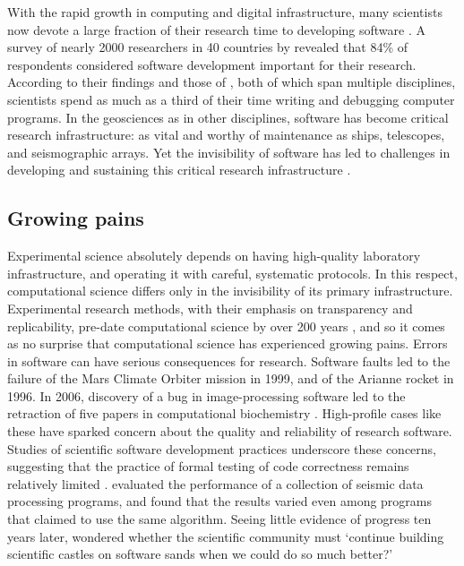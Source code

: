 \documentclass[12pt]{amsart}
\begin{document}
With the rapid growth in computing and digital infrastructure, many scientists now devote a large fraction of their research time to developing software \citep{hannay2009scientists,prabhu2011survey,wilson2014best,singh2016unsung,pinto2018scientists}. A survey of nearly 2000 researchers in 40 countries by \citet{hannay2009scientists} revealed that 84\% of respondents considered software development important for their research. According to their findings and those of \citet{prabhu2011survey}, both of which span multiple disciplines, scientists spend as much as a third of their time writing and debugging computer programs. In the geosciences as in other disciplines, software has become critical research infrastructure: as vital and worthy of maintenance as ships, telescopes, and seismographic arrays. Yet the invisibility of software  has led to challenges in developing and sustaining this critical research infrastructure \citep{eghbal2016roads}.


\subsection{Growing pains}

Experimental science absolutely depends on having high-quality laboratory infrastructure, and operating it with careful, systematic protocols. In this respect, computational science differs only in the invisibility of its primary infrastructure. Experimental research methods, with their emphasis on transparency and replicability, pre-date computational science by over 200 years \citep{wilson2006s,fomel2009reproducible}, and so it comes as no surprise that computational science has experienced growing pains. Errors in software can have serious consequences for research. Software faults led to the failure of the Mars Climate Orbiter mission in 1999, and of the Arianne rocket in 1996. In 2006, discovery of a bug in image-processing software led to the retraction of five papers in computational biochemistry \citep{miller2006scientist}. High-profile cases like these have sparked concern about the quality and reliability of research software. Studies of scientific software development practices underscore these concerns, suggesting that the practice of formal testing of code correctness remains relatively limited \citep{post2005computational,wilson2006s,hannay2009scientists,nguyen2010survey,clune2011software,howison2011scientific,prabhu2011survey,kanewala2014testing,heaton2015claims}. \citet{hatton1997t} evaluated the performance of a collection of seismic data processing programs, and found that the results varied even among programs that claimed to use the same algorithm. Seeing little evidence of progress ten years later, \citet{hatton2007chimera} wondered whether the scientific community must `continue building scientific castles on software sands when we could do so much better?'
\end{document}

